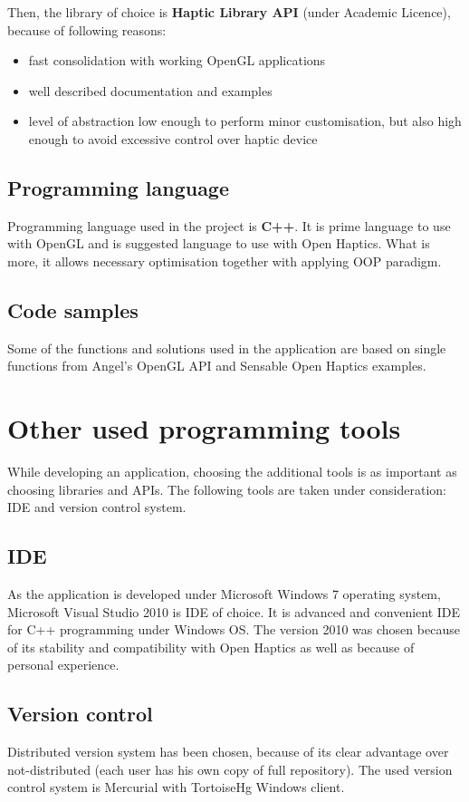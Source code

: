 Then, the library of choice is \textbf{Haptic Library API} (under Academic Licence), because of following reasons:
\begin{itemize} [noitemsep]
\item fast consolidation with working OpenGL applications
\item well described documentation and examples
\item level of abstraction low enough to perform minor customisation, but also high enough to avoid excessive control over haptic device
\end{itemize}

\subsection{Programming language}
Programming language used in the project is \textbf{C++}. It is prime language to use with OpenGL and is suggested language to use with Open Haptics. What is more, it allows necessary optimisation together with applying OOP paradigm.

\subsection{Code samples} 
Some of the functions and solutions used in the application are based on single functions from Angel's OpenGL API and Sensable Open Haptics examples.

\section{Other used programming tools}
While developing an application, choosing the additional tools is as important as choosing libraries and APIs. The following tools are taken under consideration: IDE and version control system.

\subsection{IDE}
As the application is developed under Microsoft Windows 7 operating system, Microsoft Visual Studio 2010 is IDE of choice. It is advanced and convenient IDE for C++ programming under Windows OS. The version 2010 was chosen because of its stability and compatibility with Open Haptics as well as because of personal experience. 

\subsection{Version control}
Distributed version system has been chosen, because of its clear advantage over not-distributed (each user has his own copy of full repository). The used version control system is Mercurial with TortoiseHg Windows client. 

